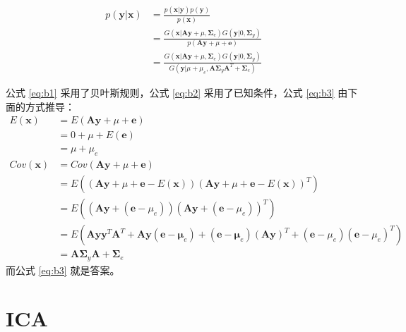     \begin{align}
        p(\mathbf{y}|\mathbf{x}) &= \frac{p(\mathbf{x}|\mathbf{y})p(\mathbf{y})}{p(\mathbf{x})} \label{eq:b1} \\
        &= \frac{G(\mathbf{x}|\mathbf{A}\mathbf{y}+\mu,\mathbf{\Sigma}_e)G(\mathbf{y}|0,\mathbf{\Sigma}_y)}{p(\mathbf{A}\mathbf{y}+\mu+\mathbf{e})} \label{eq:b2} \\
        &= \frac{G(\mathbf{x}|\mathbf{A}\mathbf{y}+\mu,\mathbf{\Sigma}_e)G(\mathbf{y}|0,\mathbf{\Sigma}_y)}{G(\mathbf{y}|\mu+\mu_e,\mathbf{A}\mathbf{\Sigma}_y\mathbf{A}^T+\mathbf{\Sigma}_e)} \label{eq:b3}
    \end{align}

    公式 \eqref{eq:b1} 采用了贝叶斯规则，公式 \eqref{eq:b2} 采用了已知条件，公式 \eqref{eq:b3} 由下面的方式推导：
    \begin{align*}
        E(\mathbf{x}) &= E(\mathbf{A}\mathbf{y}+\mu+\mathbf{e}) \\
        &= 0 + \mu + E(\mathbf{e}) \\
        &= \mu + \mu_e\\
        Cov(\mathbf{x}) &= Cov(\mathbf{A}\mathbf{y}+\mu+\mathbf{e}) 
        \\
        &= E((\mathbf{A}\mathbf{y}+\mu+\mathbf{e}-E(\mathbf{x}))(\mathbf{A}\mathbf{y}+\mu+\mathbf{e}-E(\mathbf{x}))^T) \\
        &= E((\mathbf{A}\mathbf{y} + (\mathbf{e}-\mu_e))(\mathbf{A}\mathbf{y} + (\mathbf{e}-\mu_e))^T)\\
        &= E(\mathbf{A}\mathbf{y}\mathbf{y}^T\mathbf{A}^T+\mathbf{A}\mathbf{y}(\mathbf{e}-\mathbf{\mu}_e)+(\mathbf{e}-\mathbf{\mu}_e)(\mathbf{Ay})^T+(\mathbf{e}-\mu_e)(\mathbf{e}-\mu_e)^T)\\
        &= \mathbf{A}\mathbf{\Sigma}_y\mathbf{A} + \mathbf{\Sigma}_e
    \end{align*}
    而公式 \eqref{eq:b3} 就是答案。

    \section{ICA}

